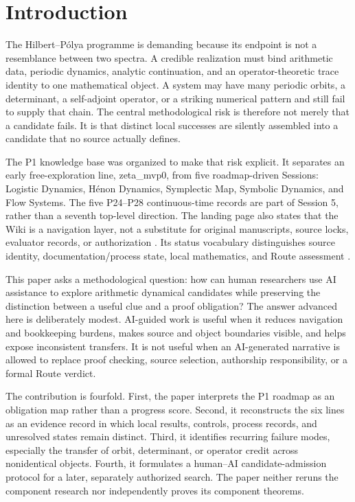 \hypertarget{introduction}{%
\section{Introduction}\label{introduction}}

The Hilbert--Pólya programme is demanding because its endpoint is not a resemblance between two spectra. A credible realization must bind arithmetic data, periodic dynamics, analytic continuation, and an operator-theoretic trace identity to one mathematical object. A system may have many periodic orbits, a determinant, a self-adjoint operator, or a striking numerical pattern and still fail to supply that chain. The central methodological risk is therefore not merely that a candidate fails. It is that distinct local successes are silently assembled into a candidate that no source actually defines.

The P1 knowledge base was organized to make that risk explicit. It separates an early free-exploration line, zeta\_mvp0, from five roadmap-driven Sessions: Logistic Dynamics, Hénon Dynamics, Symplectic Map, Symbolic Dynamics, and Flow Systems. The five P24--P28 continuous-time records are part of Session 5, rather than a seventh top-level direction. The landing page also states that the Wiki is a navigation layer, not a substitute for original manuscripts, source locks, evaluator records, or authorization . Its status vocabulary distinguishes source identity, documentation/process state, local mathematics, and Route assessment .

This paper asks a methodological question: how can human researchers use AI assistance to explore arithmetic dynamical candidates while preserving the distinction between a useful clue and a proof obligation? The answer advanced here is deliberately modest. AI-guided work is useful when it reduces navigation and bookkeeping burdens, makes source and object boundaries visible, and helps expose inconsistent transfers. It is not useful when an AI-generated narrative is allowed to replace proof checking, source selection, authorship responsibility, or a formal Route verdict.

The contribution is fourfold. First, the paper interprets the P1 roadmap as an obligation map rather than a progress score. Second, it reconstructs the six lines as an evidence record in which local results, controls, process records, and unresolved states remain distinct. Third, it identifies recurring failure modes, especially the transfer of orbit, determinant, or operator credit across nonidentical objects. Fourth, it formulates a human--AI candidate-admission protocol for a later, separately authorized search. The paper neither reruns the component research nor independently proves its component theorems.


